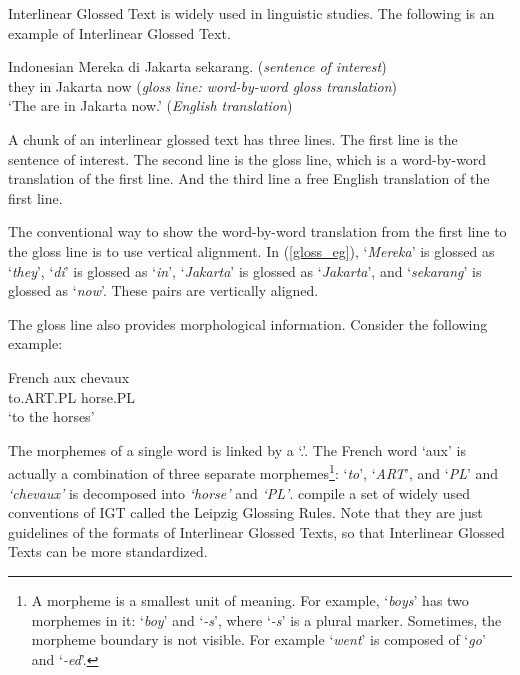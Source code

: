 \documentclass[final]{ua-thesis}
\numberwithin{equation}{section}
\begin{document}
Interlinear Glossed Text is widely used in linguistic studies. The following is an example of Interlinear Glossed Text.
\begin{exe}  
\ex\label{gloss_eg} Indonesian \citep[p. 237]{sneddon2012indonesian}
	\gll   Mereka di Jakarta sekarang. (\textit{sentence of interest})\\
     	   they in Jakarta now (\textit{gloss line: word-by-word gloss translation})\\
    \glt   `The are in Jakarta now.' (\textit{English translation})  
\end{exe}

A chunk of an interlinear glossed text has three lines. The first line is the sentence of interest. The second line is the gloss line, which is a word-by-word translation of the first line. And the third line a free English translation of the first line.

The conventional way to show the word-by-word translation from the first line to the gloss line is to use vertical alignment. In (\ref{gloss_eg}), `\textit{Mereka}' is glossed as `\textit{they}', `\textit{di}' is glossed as `\textit{in}', `\textit{Jakarta}' is glossed as `\textit{Jakarta}', and `\textit{sekarang}' is glossed as `\textit{now}'. These pairs are vertically aligned. 

The gloss line also provides morphological information. Consider the following example:

\begin{exe}  
\ex French
	\gll   aux chevaux\\
     	   to.ART.PL horse.PL \\
    \glt   `to the horses'  
\end{exe}

The morphemes of a single word is linked by a `.'. The French word `aux' is actually a combination of three separate morphemes\footnote{A morpheme is a smallest unit of meaning. For example, `\textit{boys}' has two morphemes in it: `\textit{boy}' and `\textit{-s}', where `\textit{-s}' is a plural marker. Sometimes, the morpheme boundary is not visible. For example `\textit{went}' is composed of `\textit{go}' and `\textit{-ed}'.}: `\textit{to}', `\textit{ART}', and `\textit{PL}' and \textit{`chevaux'} is decomposed into \textit{`horse'} and \textit{`PL'}.   
\citet{bickel2008leipzig} compile a set of widely used conventions of IGT called the Leipzig Glossing Rules.
Note that they are just guidelines of the formats of Interlinear Glossed Texts, so that Interlinear Glossed Texts can be more standardized. 
\end{document}
